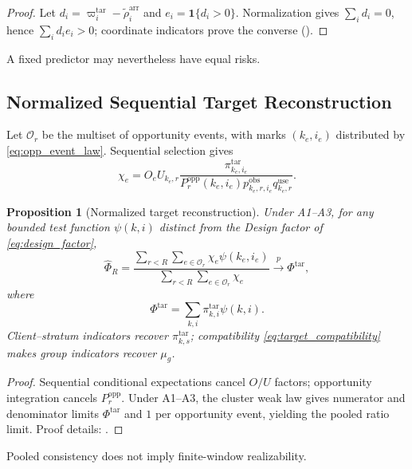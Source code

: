 \documentclass[letterpaper,journal]{IEEEtran}
\newtheorem{proposition}{Proposition}
\begin{document}
\begin{proof}
Let $d_i=\varpi_i^{\mathrm{tar}}-\widetilde\rho_i^{\mathrm{arr}}$ and
$e_i=\mathbf1\{d_i>0\}$. Normalization gives $\sum_i d_i=0$, hence
$\sum_i d_i e_i>0$; coordinate indicators prove the converse
().
\end{proof}
A fixed predictor may nevertheless have equal risks.

\subsection{Normalized Sequential Target Reconstruction}
\label{subsec:prop_reconstruction}

Let $\mathcal O_r$ be the multiset of opportunity events, with marks
$(k_e,i_e)$ distributed by \eqref{eq:opp_event_law}.  Sequential selection gives
\begin{equation}
 \chi_e
 =
 O_e U_{k_e,r}
 \frac{
 \pi^{\mathrm{tar}}_{k_e,i_e}
 }{
 P_r^{\mathrm{opp}}(k_e,i_e)
 p^{\mathrm{obs}}_{k_e,r,i_e}
 q^{\mathrm{use}}_{k_e,r}
 }.
 \label{eq:chi_event}
\end{equation}

\begin{proposition}[Normalized target reconstruction]
\label{prop:reconstruction}
Under A1--A3, for any bounded test function $\psi(k,i)$ distinct from the
Design factor of \eqref{eq:design_factor},
\begin{equation}
 \widehat\Phi_R
 =
 \frac{
 \sum_{r<R}
 \sum_{e\in\mathcal{O}_r}
 \chi_e\psi(k_e,i_e)
 }{
 \sum_{r<R}
 \sum_{e\in\mathcal{O}_r}
 \chi_e
 }
 \xrightarrow{p}
 \Phi^{\mathrm{tar}},
 \label{eq:hajek_phi}
\end{equation}
where
\begin{equation}
 \Phi^{\mathrm{tar}}
 =
 \sum_{k,i}
 \pi^{\mathrm{tar}}_{k,i}\psi(k,i).
 \label{eq:target_phi}
\end{equation}
Client--stratum indicators recover $\pi^{\mathrm{tar}}_{k,s}$; compatibility
\eqref{eq:target_compatibility} makes group indicators recover $\mu_g$.
\end{proposition}

\begin{proof}
Sequential conditional expectations cancel $O/U$ factors; opportunity
integration cancels $P_r^{\mathrm{opp}}$. Under A1--A3, the cluster weak law
gives numerator and denominator limits $\Phi^{\mathrm{tar}}$ and $1$ per opportunity
event, yielding the pooled ratio limit. Proof details: .
\end{proof}
Pooled consistency does not imply finite-window realizability.
\end{document}
